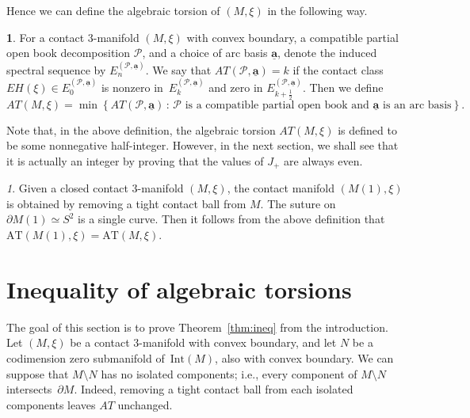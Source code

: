\documentclass[11pt,oneside,english]{amsart}
\numberwithin{equation}{section}
\numberwithin{figure}{section}
\theoremstyle{definition}
\newtheorem{defn}{\protect\definitionname}
\theoremstyle{plain}
\theoremstyle{plain}
\theoremstyle{remark}
\newtheorem*{rem*}{\protect\remarkname}
\theoremstyle{plain}
\providecommand{\definitionname}{Definition}
\providecommand{\remarkname}{Remark}
\begin{document}
Hence we can define the algebraic torsion of $(M,\xi)$ in the following way.
\begin{defn}
For a contact $3$-manifold $(M,\xi)$ with
convex boundary, a compatible partial open book decomposition $\mathcal{P}$,
and a choice of arc basis $\underline{\mathbf{a}}$, denote the induced
spectral sequence by $E_{n}^{(\mathcal{P},\underline{\mathbf{a}})}$.
We say that $AT(\mathcal{P},\underline{\mathbf{a}})=k$ if the contact
class $EH(\xi)\in E_{0}^{(\mathcal{P},\underline{\mathbf{a}})}$ is
nonzero in~$E_{k}^{(\mathcal{P},\underline{\mathbf{a}})}$ and zero
in $E_{k+\frac{1}{2}}^{(\mathcal{P},\underline{\mathbf{a}})}$. Then
we define
\[
{\mathit{AT}}(M,\xi)=\min\left\{ AT(\mathcal{P},\underline{\mathbf{a}})\,\colon\,\mathcal{P}\mbox{ is a compatible partial open book and }\underline{\mathbf{a}}\mbox{ is an arc basis}\right\} .
\]
\end{defn}

Note that, in the above definition, the algebraic torsion ${\mathit{AT}}(M,\xi)$
is defined to be some nonnegative half-integer. However, in the next
section, we shall see that it is actually an integer by proving that
the values of $J_{+}$ are always even.

\begin{rem*}
Given a closed contact $3$-manifold $(M,\xi)$,
the contact manifold $(M(1),\xi)$ is obtained by removing
a tight contact ball from $M$. The suture on $\partial M(1)\simeq S^{2}$
is a single curve. Then it follows from the above definition that
$\mbox{AT}(M(1),\xi)=\mbox{AT}(M,\xi)$.
\end{rem*}

\section{Inequality of algebraic torsions} \label{sec:ineq}

The goal of this section is to prove Theorem~\ref{thm:ineq} from the introduction.
Let $(M,\xi)$ be a contact $3$-manifold with convex boundary,
and let $N$ be a codimension zero submanifold of~$\text{Int}(M)$, also with convex
boundary. We can suppose that $M \setminus N$ has no isolated components; i.e., every
component of $M \setminus N$ intersects~$\partial M$. Indeed, removing a tight contact 
ball from each isolated components leaves ${\mathit{AT}}$ unchanged. 
\end{document}

